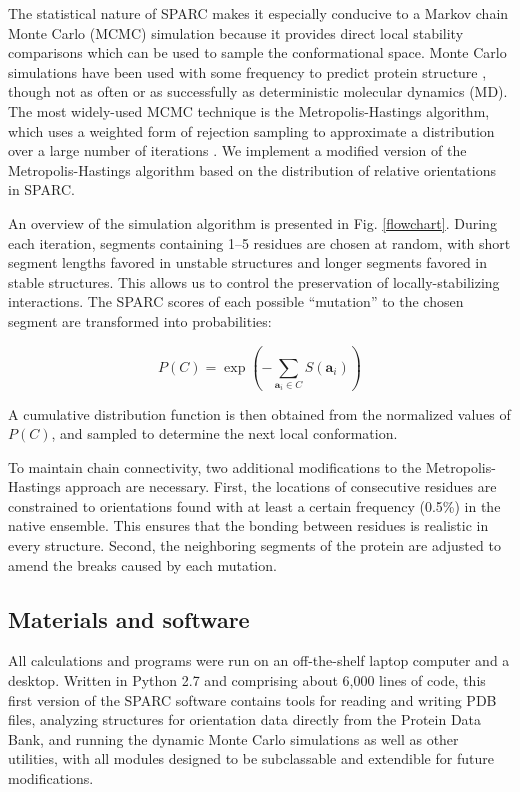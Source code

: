 \documentclass[11pt,titlepage]{article}
\begin{document}
The statistical nature of SPARC makes it especially conducive to a Markov chain Monte Carlo (MCMC) simulation because it provides direct local stability comparisons which can be used to sample the conformational space.
Monte Carlo simulations have been used with some frequency to predict protein structure \cite{kolinski,enciso}, though not as often or as successfully as deterministic molecular dynamics (MD).
The most widely-used MCMC technique is the Metropolis-Hastings algorithm, which uses a weighted form of rejection sampling to approximate a distribution over a large number of iterations \cite{metropolis}.
We implement a modified version of the Metropolis-Hastings algorithm based on the distribution of relative orientations in SPARC.

An overview of the simulation algorithm is presented in Fig. \ref{flowchart}.
During each iteration, segments containing 1--5 residues are chosen at random, with short segment lengths favored in unstable structures and longer segments favored in stable structures.
This allows us to control the preservation of locally-stabilizing interactions.
The SPARC scores of each possible ``mutation'' to the chosen segment are transformed into probabilities:

\begin{equation}
P(C) = \exp{\left(-\sum_{\textbf{a}_i\in C}S(\textbf{a}_i)\right)}
\label{probability_eq}
\end{equation}

A cumulative distribution function is then obtained from the normalized values of $P(C)$, and sampled to determine the next local conformation.

To maintain chain connectivity, two additional modifications to the Metropolis-Hastings approach are necessary. 
First, the locations of consecutive residues are constrained to orientations found with at least a certain frequency (0.5\%) in the native ensemble.
This ensures that the bonding between residues is realistic in every structure.
Second, the neighboring segments of the protein are adjusted to amend the breaks caused by each mutation.

\subsection{Materials and software}
\label{materials}
All calculations and programs were run on an off-the-shelf laptop computer and a desktop.
Written in Python 2.7 and comprising about 6,000 lines of code, this first version of the SPARC software contains tools for reading and writing PDB files, analyzing structures for orientation data directly from the Protein Data Bank, and running the dynamic Monte Carlo simulations as well as other utilities, with all modules designed to be subclassable and extendible for future modifications.
\end{document}
